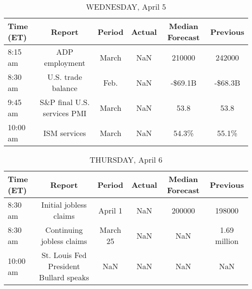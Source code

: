 \documentclass{article}%
\begin{document}
\begin{table}[htbp]%
\caption{WEDNESDAY, April 5}%
\centering%
\begin{adjustbox}{width=1\textwidth}%
\begin{tabular}{lccccc}
\toprule
Time (ET) &                      Report & Period & Actual & Median Forecast & Previous \\
\midrule
  8:15 am &              ADP employment &  March &    NaN &          210000 &   242000 \\
  8:30 am &          U.S. trade balance &   Feb. &    NaN &         -\$69.1B &  -\$68.3B \\
  9:45 am & S\&P final U.S. services PMI &  March &    NaN &            53.8 &     53.8 \\
 10:00 am &                ISM services &  March &    NaN &           54.3\% &    55.1\% \\
\bottomrule
\end{tabular}
%
\end{adjustbox}%
\end{table}

%


\begin{table}[htbp]%
\caption{THURSDAY, April 6}%
\centering%
\begin{adjustbox}{width=1\textwidth}%
\begin{tabular}{lccccc}
\toprule
Time (ET) &                                 Report &   Period & Actual & Median Forecast &     Previous \\
\midrule
  8:30 am &                 Initial jobless claims &  April 1 &    NaN &          200000 &       198000 \\
  8:30 am &              Continuing jobless claims & March 25 &    NaN &             NaN & 1.69 million \\
 10:00 am & St. Louis Fed President Bullard speaks &      NaN &    NaN &             NaN &          NaN \\
\bottomrule
\end{tabular}
%
\end{adjustbox}%
\end{table}

%
\end{document}
